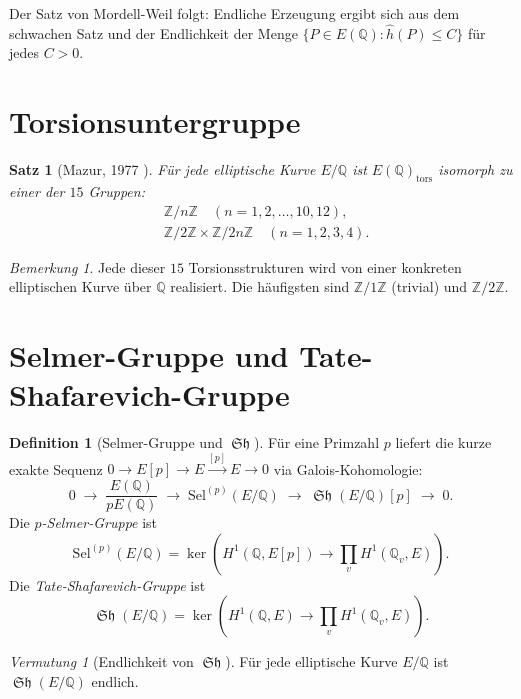 \documentclass[12pt,a4paper]{amsart}
\newtheorem{satz}[theorem]{Satz}
\theoremstyle{definition}
\newtheorem{definition_de}[theorem]{Definition}
\theoremstyle{remark}
\newtheorem{bemerkung}[theorem]{Bemerkung}
\newtheorem{vermutung}[theorem]{Vermutung}
\newcommand{\Z}{\mathbb{Z}}
\newcommand{\Q}{\mathbb{Q}}
\newcommand{\Sel}{\mathrm{Sel}}
\DeclareMathOperator{\Sha}{\mathfrak{Sh}}
\begin{document}
Der Satz von Mordell-Weil folgt: Endliche Erzeugung ergibt sich aus dem schwachen Satz
und der Endlichkeit der Menge $\{P \in E(\Q) : \hat{h}(P) \leq C\}$ für jedes $C > 0$.

\section{Torsionsuntergruppe}\label{sec:torsion}

\begin{satz}[Mazur, 1977 \cite{Mazur1977}]
  Für jede elliptische Kurve $E/\Q$ ist $E(\Q)_{\mathrm{tors}}$ isomorph zu einer der
  $15$ Gruppen:
  \begin{align*}
    &\Z/n\Z \quad (n = 1,2,\ldots,10,12), \\
    &\Z/2\Z \times \Z/2n\Z \quad (n = 1,2,3,4).
  \end{align*}
\end{satz}

\begin{bemerkung}
  Jede dieser $15$ Torsionsstrukturen wird von einer konkreten elliptischen Kurve über
  $\Q$ realisiert. Die häufigsten sind $\Z/1\Z$ (trivial) und $\Z/2\Z$.
\end{bemerkung}

\section{Selmer-Gruppe und Tate-Shafarevich-Gruppe}\label{sec:selmer}

\begin{definition_de}[Selmer-Gruppe und $\Sha$]
  Für eine Primzahl $p$ liefert die kurze exakte Sequenz
  $0 \to E[p] \to E \xrightarrow{[p]} E \to 0$
  via Galois-Kohomologie:
  \[
    0 \;\to\; \frac{E(\Q)}{pE(\Q)} \;\to\; \Sel^{(p)}(E/\Q)
    \;\to\; \Sha(E/\Q)[p] \;\to\; 0.
  \]
  Die \emph{$p$-Selmer-Gruppe} ist
  \[
    \Sel^{(p)}(E/\Q) = \ker\!\left(H^1(\Q, E[p]) \to \prod_v H^1(\Q_v, E)\right).
  \]
  Die \emph{Tate-Shafarevich-Gruppe} ist
  \[
    \Sha(E/\Q) = \ker\!\left(H^1(\Q, E) \to \prod_v H^1(\Q_v, E)\right).
  \]
\end{definition_de}

\begin{vermutung}[Endlichkeit von $\Sha$]\label{verm:sha}
  Für jede elliptische Kurve $E/\Q$ ist $\Sha(E/\Q)$ endlich.
\end{vermutung}
\end{document}
